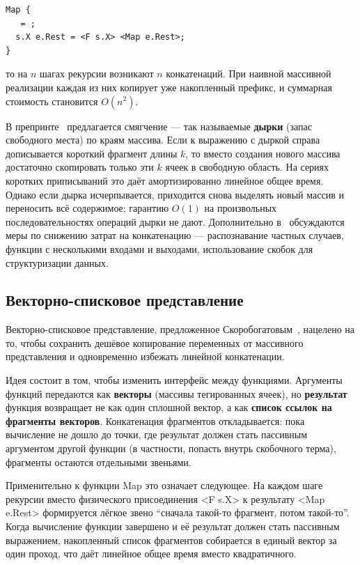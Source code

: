 \documentclass[14pt, russian]{scrartcl}
\newcommand{\enq}[1]{\enquote{#1}}
\newcommand{\prog}[1]{{\ttfamily\small#1}}
\begin{document}
\begin{lstlisting}[language=Refal,caption={Построение результата через рекурсивную конкатенацию},label={lst:map}]
Map {
   = ;
  s.X e.Rest = <F s.X> <Map e.Rest>;
}
\end{lstlisting}

то на \(n\) шагах рекурсии возникают \(n\) конкатенаций. При наивной
массивной реализации каждая из них копирует уже накопленный префикс, и
суммарная стоимость становится \(O(n^2)\).

В препринте~\cite{abramov_romanenko_1988} предлагается смягчение --- так
называемые \textbf{дырки} (запас свободного места) по краям массива. Если
к выражению с дыркой справа дописывается короткий фрагмент длины \(k\),
то вместо создания нового массива достаточно скопировать только эти \(k\)
ячеек в свободную область. На сериях коротких приписываний это даёт
амортизированно линейное общее время. Однако если дырка исчерпывается,
приходится снова выделять новый массив и переносить всё содержимое;
гарантию \(O(1)\) на произвольных последовательностях операций дырки не
дают. Дополнительно в~\cite{abramov_romanenko_1988} обсуждаются меры по
снижению затрат на конкатенацию --- распознавание частных случаев,
функции с несколькими входами и выходами, использование скобок для
структуризации данных.

\subsection{Векторно-списковое представление}
\label{sec:vector-list}

Векторно-списковое представление, предложенное
Скоробогатовым~\cite{skorobogatov_repr}, нацелено на то, чтобы сохранить
дешёвое копирование переменных от массивного представления и одновременно
избежать линейной конкатенации.

Идея состоит в том, чтобы изменить интерфейс между функциями. Аргументы
функций передаются как \textbf{векторы} (массивы тегированных ячеек), но
\textbf{результат} функция возвращает не как один сплошной вектор, а как
\textbf{список ссылок на фрагменты векторов}. Конкатенация фрагментов
откладывается: пока вычисление не дошло до точки, где результат должен
стать пассивным аргументом другой функции (в частности, попасть внутрь
скобочного терма), фрагменты остаются отдельными звеньями.

Применительно к функции \prog{Map} это означает следующее. На каждом шаге
рекурсии вместо физического присоединения \prog{<F s.X>} к результату
\prog{<Map e.Rest>} формируется лёгкое звено \enq{сначала такой-то
фрагмент, потом такой-то}. Когда вычисление функции завершено и её
результат должен стать пассивным выражением, накопленный список
фрагментов собирается в единый вектор за один проход, что даёт линейное
общее время вместо квадратичного.
\end{document}
